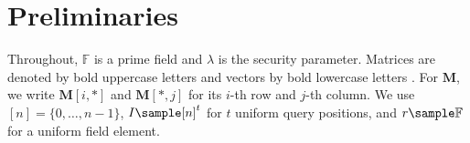 \documentclass[conference,compsoc]{IEEEtran}
\newcommand{\mat}{\mathbf}          %
\newcommand{\protocol}{\textsf{LAMP}}   %
\theoremstyle{plain}
\theoremstyle{definition}
\theoremstyle{remark}
\providecommand{\DIFaddtex}[1]{{\protect\color{DIFADD} \sf #1}} %
\providecommand{\DIFaddbegin}{} %
\providecommand{\DIFaddend}{} %
\providecommand{\DIFadd}[1]{\texorpdfstring{\DIFaddtex{#1}}{#1}} %
\providecommand{\DIFaddincludegraphics}[2][]{{\color{blue}\fbox{\DIFOincludegraphics[#1]{#2}}}} %
\DeclareRobustCommand{\DIFaddbegin}{\DIFOaddbegin \let\includegraphics\DIFaddincludegraphics} %
\DeclareRobustCommand{\DIFaddend}{\DIFOaddend \let\includegraphics\DIFOincludegraphics} %
\begin{document}



\section{Preliminaries}
\label{sec:prelim}

 \DIFaddbegin \DIFadd{Throughout, \(\mathbb{F}\) is a prime field and \(\lambda\) is }\DIFaddend the security
parameter.   Matrices are denoted by bold uppercase letters  and vectors by bold
lowercase letters \DIFaddbegin \DIFadd{.  For \(\mat{M}\)}\DIFaddend , we write  \DIFaddbegin \DIFadd{\(\mat{M}[i,*]\) and
\(\mat{M}[*,j]\) for its \(i\)}\DIFaddend -th  \DIFaddbegin \DIFadd{row and \(j\)}\DIFaddend -th column.  We  \DIFaddbegin \DIFadd{use
\([n]=\{0,\ldots,n-1\}\), \(I\sample[n]^t\) for \(t\) uniform query
positions, and \(r\sample\mathbb{F}\) for a uniform field element}\DIFaddend .
\end{document}
